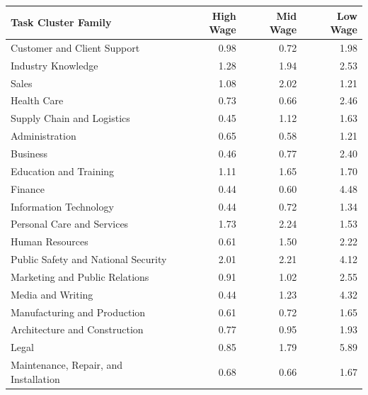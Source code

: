 \documentclass[letterpaper]{article} %
\begin{document}
\begin{table}[h!]
\centering
\scriptsize
\begin{tabular}{l || r | r | r}
                                 Task Cluster Family & High Wage & Mid Wage & Low Wage \\
\hline\hline
                 Customer and Client Support &      0.98 &     0.72 &     1.98 \\
                          Industry Knowledge &      1.28 &     1.94 &     2.53 \\
                                       Sales &      1.08 &     2.02 &     1.21 \\
                                 Health Care &      0.73 &     0.66 &     2.46 \\
                  Supply Chain and Logistics &      0.45 &     1.12 &     1.63 \\
                              Administration &      0.65 &     0.58 &     1.21 \\
                                    Business &      0.46 &     0.77 &     2.40 \\
                      Education and Training &      1.11 &     1.65 &     1.70 \\
                                     Finance &      0.44 &     0.60 &     4.48 \\
                      Information Technology &      0.44 &     0.72 &     1.34 \\
                  Personal Care and Services &      1.73 &     2.24 &     1.53 \\
                             Human Resources &      0.61 &     1.50 &     2.22 \\
         Public Safety and National Security &      2.01 &     2.21 &     4.12 \\
              Marketing and Public Relations &      0.91 &     1.02 &     2.55 \\
                           Media and Writing &      0.44 &     1.23 &     4.32 \\
                Manufacturing and Production &      0.61 &     0.72 &     1.65 \\
               Architecture and Construction &      0.77 &     0.95 &     1.93 \\
                                       Legal &      0.85 &     1.79 &     5.89 \\
       Maintenance, Repair, and Installation &      0.68 &     0.66 &     1.67 \\

\end{tabular}
\end{table}
\end{document}
